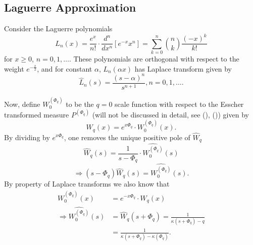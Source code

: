 \subsection{Laguerre Approximation}
\label{LaguerreSec}
Consider the Laguerre polynomials
\[
L_n(x) = \frac{e^x}{n!} \cdot \frac{d^n}{dx^n}[e^{-x} x^n] = \sum_{k=0}^{n} \binom{n}{k} \frac{(-x)^k}{k!}
\]
for $x \geq 0$, $n=0, 1, \ldots$. These polynomials are orthogonal with respect to the weight $e^{-\frac{x}{2}}$, and for constant $\alpha$, $L_n(\alpha x)$ has Laplace transform given by
\[
\hat{L}_n(s) = \frac{(s-\alpha)^n}{s^{n+1}}, n=0,1, \ldots.
\]

Now, define $W^{(\Phi_q)}_0$ to be the $q=0$ scale function with respect to the Esscher transformed measure $P^{(\Phi_q)}$ (will not be discussed in detail, see (\cite{AA}), (\cite{Kyp})) given by
\[
W_q(x) = e^{x \Phi_q} \cdot W^{(\Phi_q)}_0 (x).
\]
By dividing by $e^{x \Phi_q}$, one removes the unique positive pole of $\hat{W}_q$
\[
\hat{W}_q(s) = \frac{1}{s - \Phi_q} \cdot \widehat{W^{(\Phi_q)}_0} (s)
\]
\[
\Rightarrow (s - \Phi_q)\hat{W}_q(s) = \widehat{W^{(\Phi_q)}_0} (s).
\]
By property of Laplace transforms we also know that
\begin{align*}
W^{(\Phi_q)}_0 (x) &=  e^{-x \Phi_q} \cdot W_q(x)\\
\Rightarrow \widehat{W^{(\Phi_q)}_0} (s) &= \hat{W}_q(s + \Phi_q) = \frac{1}{\kappa(s + \Phi_q) - q}\\
&= \frac{1}{\kappa(s + \Phi_q) - \kappa(\Phi_q)}.
\end{align*}

